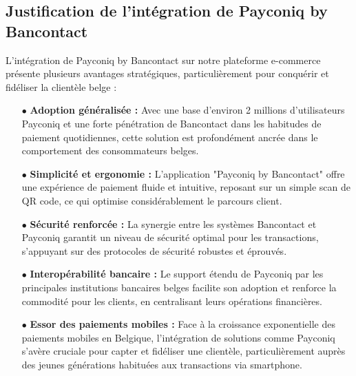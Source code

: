\subsection{Justification de l'intégration de Payconiq by Bancontact }
L'intégration de Payconiq by Bancontact  sur notre plateforme e-commerce présente plusieurs avantages stratégiques, particulièrement pour conquérir et fidéliser la clientèle belge :
\begin{itemize}
    \item [$\bullet$]\textbf{Adoption généralisée :} Avec une base d'environ 2 millions d'utilisateurs Payconiq et une forte pénétration de Bancontact dans les habitudes de paiement quotidiennes, cette solution est profondément ancrée dans le comportement des consommateurs belges.
    \item [$\bullet$]\textbf{Simplicité et ergonomie :} L'application "Payconiq by Bancontact" offre une expérience de paiement fluide et intuitive, reposant sur un simple scan de QR code, ce qui optimise considérablement le parcours client.
    \item [$\bullet$]\textbf{Sécurité renforcée :} La synergie entre les systèmes Bancontact et Payconiq garantit un niveau de sécurité optimal pour les transactions, s'appuyant sur des protocoles de sécurité robustes et éprouvés.
    \item [$\bullet$]\textbf{Interopérabilité bancaire :} Le support étendu de Payconiq par les principales institutions bancaires belges facilite son adoption et renforce la commodité pour les clients, en centralisant leurs opérations financières.
    \item [$\bullet$]\textbf{Essor des paiements mobiles :} Face à la croissance exponentielle des paiements mobiles en Belgique, l'intégration de solutions comme Payconiq s'avère cruciale pour capter et fidéliser une clientèle, particulièrement auprès des jeunes générations habituées aux transactions via smartphone.
\end{itemize}
